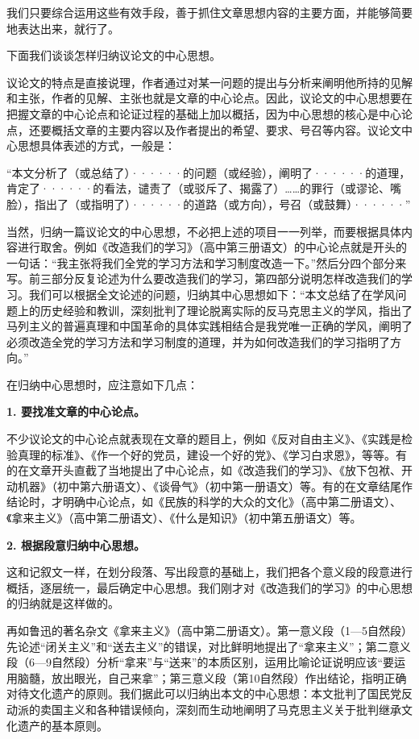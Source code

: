 我们只要综合运用这些有效手段，善于抓住文章思想内容的主要方面，并能够简要地表达出来，就行了。

下面我们谈谈怎样归纳议论文的中心思想。

议论文的特点是直接说理，作者通过对某一问题的提出与分析来阐明他所持的见解和主张，作者的见解、主张也就是文章的中心论点。因此，议论文的中心思想要在把握文章的中心论点和论证过程的基础上加以概括，因为中心思想的核心是中心论点，还要概括文章的主要内容以及作者提出的希望、要求、号召等内容。议论文中心思想具体表述的方式，一般是：

“本文分析了（或总结了）······的问题（或经验），阐明了······的道理，肯定了······的看法，谴责了（或驳斥了、揭露了）……的罪行（或谬论、嘴脸），指出了（或指明了）······的道路（或方向），号召（或鼓舞）······”

当然，归纳一篇议论文的中心思想，不必把上述的项目一一列举，而要根据具体内容进行取舍。例如《改造我们的学习》（高中第三册语文）的中心论点就是开头的一句话：“我主张将我们全党的学习方法和学习制度改造一下。”然后分四个部分来写。前三部分反复论述为什么要改造我们的学习，第四部分说明怎样改造我们的学习。我们可以根据全文论述的问题，归纳其中心思想如下：“本文总结了在学风问题上的历史经验和教训，深刻批判了理论脱离实际的反马克思主义的学风，指出了马列主义的普遍真理和中国革命的具体实践相结合是我党唯一正确的学风，阐明了必须改造全党的学习方法和学习制度的道理，并为如何改造我们的学习指明了方向。”

在归纳中心思想时，应注意如下几点：

\textbf{1. 要找准文章的中心论点。}

不少议论文的中心论点就表现在文章的题目上，例如《反对自由主义》、《实践是检验真理的标准》、《作一个好的党员，建设一个好的党》、《学习白求恩》，等等。有的在文章开头直截了当地提出了中心论点，如《改造我们的学习》、《放下包袱、开动机器》（初中第六册语文）、《谈骨气》（初中第一册语文）等。有的在文章结尾作结论时，才明确中心论点，如《民族的科学的大众的文化》（高中第二册语文）、《拿来主义》（高中第二册语文）、《什么是知识》（初中第五册语文）等。

\textbf{2. 根据段意归纳中心思想。}

这和记叙文一样，在划分段落、写出段意的基础上，我们把各个意义段的段意进行概括，逐层统一，最后确定中心思想。我们刚才对《改造我们的学习》的中心思想的归纳就是这样做的。

再如鲁迅的著名杂文《拿来主义》（高中第二册语文）。第一意义段（1—5自然段）先论述“闭关主义”和“送去主义”的错误，对比鲜明地提出了“拿来主义”；第二意义段（6—9自然段）分析“拿来”与“送来”的本质区别，运用比喻论证说明应该“要运用脑髓，放出眼光，自己来拿”；第三意义段（第10自然段）作出结论，指明正确对待文化遗产的原则。我们据此可以归纳出本文的中心思想：本文批判了国民党反动派的卖国主义和各种错误倾向，深刻而生动地阐明了马克思主义关于批判继承文化遗产的基本原则。

